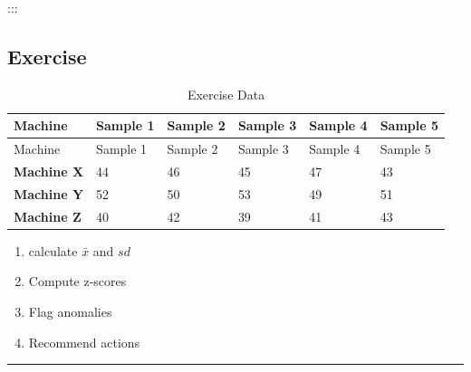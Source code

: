 \documentclass[
  a4paper,
]{scrbook}
\providecommand{\tightlist}{%
  \setlength{\itemsep}{0pt}\setlength{\parskip}{0pt}}\usepackage{longtable,booktabs,array}
\begin{document}
:::

\subsection{Exercise}\label{exercise-1}

\begin{longtable}[]{@{}llllll@{}}
\caption{Exercise Data}\tabularnewline
\toprule\noalign{}
Machine & Sample 1 & Sample 2 & Sample 3 & Sample 4 & Sample 5 \\
\midrule\noalign{}
\endfirsthead
\toprule\noalign{}
Machine & Sample 1 & Sample 2 & Sample 3 & Sample 4 & Sample 5 \\
\midrule\noalign{}
\endhead
\bottomrule\noalign{}
\endlastfoot
\textbf{Machine X} & 44 & 46 & 45 & 47 & 43 \\
\textbf{Machine Y} & 52 & 50 & 53 & 49 & 51 \\
\textbf{Machine Z} & 40 & 42 & 39 & 41 & 43 \\
\end{longtable}

\begin{table}

\caption{\label{tbl-exercise-z}Exercise Data}


\end{table}%

\begin{enumerate}
\def\labelenumi{\arabic{enumi}.}
\tightlist
\item
  calculate \(\bar{x}\) and \(sd\)
\item
  Compute z-scores
\item
  Flag anomalies
\item
  Recommend actions
\end{enumerate}

\begin{center}\rule{0.5\linewidth}{0.5pt}\end{center}
\end{document}
